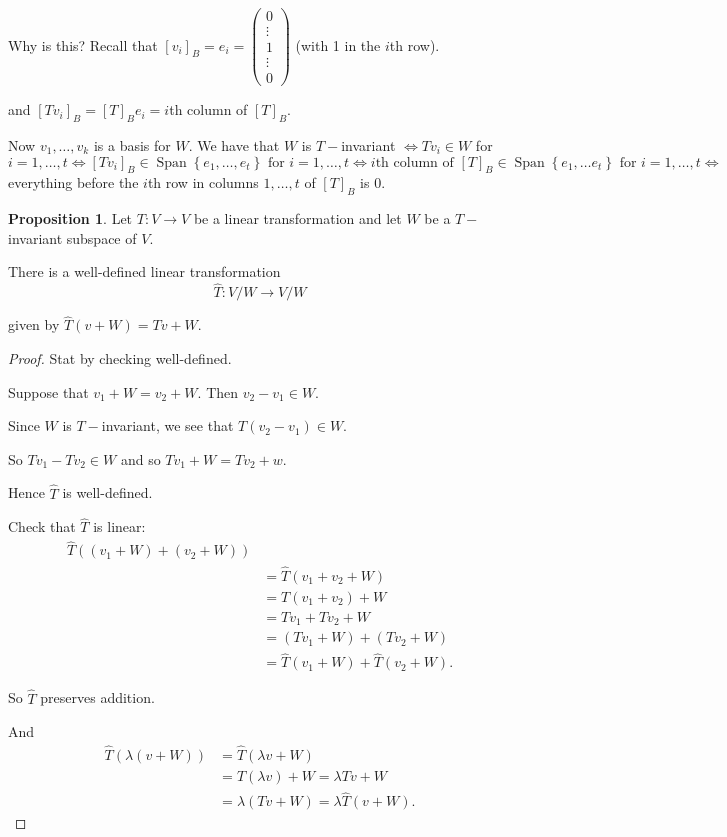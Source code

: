 \documentclass{article}
\theoremstyle{definition} \newtheorem*{definition}{Definition}
\newtheorem{proposition}[theorem]{Proposition}
\DeclareMathOperator{\Span}{Span}
\begin{document}
 Why is this? Recall that 
 $[v_i]_B = e_i = \left( 
 \begin{matrix}
   0 \\
   \vdots \\
   1 \\
   \vdots \\
   0
 \end{matrix}
 \right)$ (with 1 in the $i$th row).

 and $[Tv_i]_B = [T]_B e_i = i$th column of $[T]_B$.

 Now $v_1,\dots,v_k$ is a basis for $W$. We have that
 $W$ is $T-$invariant $ 
   \iff Tv_i \in W$ for $i = 1, \dots, t 
   \iff [Tv_i]_B \in \Span\left\{ e_1, \dots, e_t \right\} 
   \text{ for } i = 1, \dots , t 
   \iff i\text{th column of } [T]_B \in 
   \Span \left\{ e_1, \dots e_t \right\} \text{ for } i = 1, \dots, t \iff$ 
 everything before the $i$th row in columns $1, \dots, t$ of $[T]_B$ is 0.\\

 \begin{proposition}
   Let $T:V \rightarrow V$ be a linear transformation and let $W$ be a $T-$invariant
   subspace of $V$.

   There is a well-defined linear transformation 
   \[
     \hat{T} : V/W \rightarrow V/W
   \]

   given by $\hat{T}(v + W) = Tv + W$.
 \end{proposition}

 \begin{proof}
   Stat by checking well-defined.

   Suppose that $v_1 + W = v_2 + W$. Then $v_2 - v_1 \in W$.

   Since $W$ is $T-$invariant, we see that $T(v_2 - v_1) \in W$.

   So $Tv_1 - Tv_2 \in W$ and so $Tv_1 + W = Tv_2 + w$.

   Hence $\hat{T}$ is well-defined.

   Check that $\hat{T}$ is linear: 
   \begin{align*}
   \hat{T}\left( (v_1 + W) + (v_2 + W)  \right) \\
   &= \hat{T}(v_1 + v_2 + W) \\
   &= T(v_1 + v_2) + W \\
     &= Tv_1 + Tv_2 + W \\
     &= (Tv_1 + W) + (Tv_2 + W) \\
     &= \hat{T}(v_1 + W) + \hat{T}(v_2 + W).
   \end{align*}

   So $\hat{T}$ preserves addition.

   And 
   \begin{align*}
     \hat{T}(\lambda(v + W)) &= \hat{T}(\lambda v + W) \\
     &= T(\lambda v) + W = \lambda Tv + W \\
     &= \lambda (Tv + W) = \lambda \hat{T} (v + W).
   \end{align*}
 \end{proof}
\end{document}
